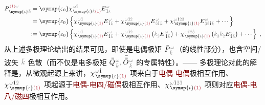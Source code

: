 \begin{subequations}
\begin{align}
	P^{\;\! \textcolor{Maroon}{(1)} \mathcolor{gray}{\omega}}_{\;\! \symup{\iota}\mathcolor{gray}{\bar{k}}} =&~ {\symup{\varepsilon_0}} \chi^{\;\! \mathcolor{gray}{\omega} \hat{1}}_{\;\! \symup{\iota} \mathcolor{gray}{\bar{k}} \textcolor{Maroon}{(1)}} E^{\;\!\mathcolor{gray}{\omega}}_{\;\! \hat{1} \mathcolor{gray}{\bar{k}}} \\ =&~ {\symup{\varepsilon_0}} \left\{ \chi^{\;\! \mathcolor{gray}{\omega} \hat{1}}_{\;\! \symup{\iota} \textcolor{Maroon}{(1)}} E^{\;\!\mathcolor{gray}{\omega}}_{\;\! \hat{1} \mathcolor{gray}{\bar{k}}} + \chi^{\;\! \mathcolor{gray}{\omega} \hat{1} \mathcolor{gray}{\hat{2}}}_{\;\! \symup{\iota} \textcolor{Maroon}{(1)}} E^{\;\!\mathcolor{gray}{\omega}}_{\;\! \mathcolor{gray}{\hat{2}} \hat{1} \mathcolor{gray}{\bar{k}}} + \chi^{\;\! \mathcolor{gray}{\omega} \hat{1} \mathcolor{gray}{\hat{2} \hat{3}}}_{\;\! \symup{\iota} \textcolor{Maroon}{(1)}} E^{\;\!\mathcolor{gray}{\omega}}_{\;\! \mathcolor{gray}{\hat{3} \hat{2}} \hat{1} \mathcolor{gray}{\bar{k}}} + \cdots \right\}  \label{eq:P(1)_wk} \\ :=&~ {\symup{\varepsilon_0}} \left\{ \chi^{\;\! \mathcolor{gray}{\omega} \hat{1}}_{\;\! \symup{\iota} \textcolor{Maroon}{(1)}} E^{\;\!\mathcolor{gray}{\omega}}_{\;\! \hat{1} \mathcolor{gray}{\bar{k}}} + \chi^{\;\! \mathcolor{gray}{\omega} \hat{1} \mathcolor{gray}{\hat{2}}}_{\;\! \symup{\iota} \textcolor{Maroon}{(1)}} \left( \mathcolor{gray}{k_{\hat{2}}} E^{\;\!\mathcolor{gray}{\omega}}_{\;\hat{1} \mathcolor{gray}{\bar{k}}} \right) + \chi^{\;\! \mathcolor{gray}{\omega} \hat{1} \mathcolor{gray}{\hat{2} \hat{3}}}_{\;\! \symup{\iota} \textcolor{Maroon}{(1)}} \left( \mathcolor{gray}{k_{\hat{3}}} \mathcolor{gray}{k_{\hat{2}}} E^{\;\!\mathcolor{gray}{\omega}}_{\;\! \hat{1} \mathcolor{gray}{\bar{k}}} \right) + \cdots \right\}~,
\end{align}
\end{subequations}
从上述多极理论给出的结果可见，即使是电偶极矩 $\bar{P}^{\;\!\mathcolor{gray}{\omega}}_{\;\!\mathcolor{gray}{\bar{k}}}$（的线性部分），也含空间/波矢 $\mathcolor{gray}{\bar{k}}$ 色散（而不仅是电多极矩 $\bar{\bar{Q}}^{\;\!\mathcolor{gray}{\omega}}_{\;\!\mathcolor{gray}{\bar{k}}},\bar{\bar{\bar{O}}}^{\;\!\mathcolor{gray}{\omega}}_{\;\!\mathcolor{gray}{\bar{k}}}$ 的专属特性）。—— 多极理论对此的解释是，从微观起源上来讲，$\chi^{\;\! \mathcolor{gray}{\omega} \hat{1}}_{\;\! \symup{\iota} \textcolor{Maroon}{(1)}}$ 项来自于\textcolor{Maroon}{电偶-电偶}极相互作用、$\chi^{\;\! \mathcolor{gray}{\omega} \hat{1} \mathcolor{gray}{\hat{2}}}_{\;\! \symup{\iota} \textcolor{Maroon}{(1)}}$ 项起源于\textcolor{Maroon}{电偶-电四/磁偶}极相互作用、$\chi^{\;\! \mathcolor{gray}{\omega} \hat{1} \mathcolor{gray}{\hat{2} \hat{3}}}_{\;\! \symup{\iota} \textcolor{Maroon}{(1)}}$ 项则对应\textcolor{Maroon}{电偶-电八/磁四}极相互作用。

